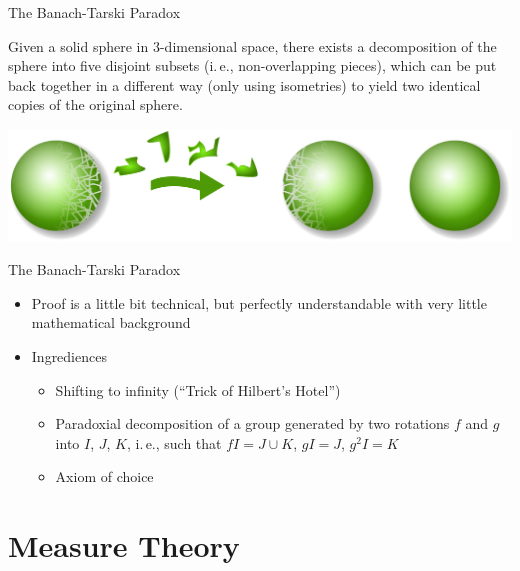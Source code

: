 \documentclass[compress]{beamer}
\begin{document}
\begin{frame}{The Banach-Tarski Paradox}
  \begin{theorem}
    Given a solid sphere in 3-dimensional space, there exists a decomposition of
    the sphere into five disjoint subsets (i.\,e., non-overlapping pieces),
    which can be put back together in a different way (only using isometries) to
    yield two identical copies of the original sphere.
  \end{theorem}
  \pause
  \includegraphics[width=\linewidth]{Banach-Tarski_Paradox-Illustration.png}
\end{frame}

\begin{frame}{The Banach-Tarski Paradox}
  \begin{itemize}
  \item Proof is a little bit technical, but perfectly understandable
     with very little mathematical background
  \item Ingrediences
    \begin{itemize}
    \item Shifting to infinity (``Trick of Hilbert's Hotel'')
    \item Paradoxial decomposition of a group generated by two rotations $f$ and $g$ into $I$, $J$, $K$, i.\,e., such that $fI = J \cup K$, $gI = J$, $g^2I = K$
    \item Axiom of choice
    \end{itemize}
  \end{itemize}
\end{frame}

\section{Measure Theory}
\end{document}
